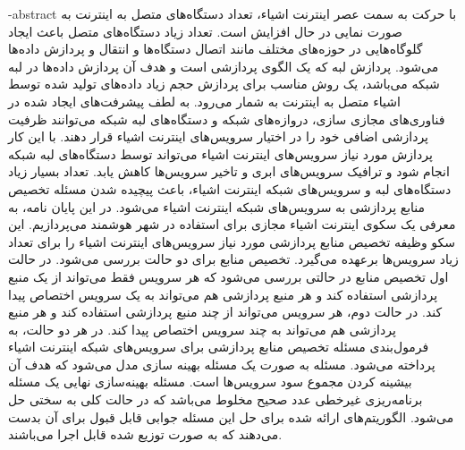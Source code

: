 \cleartorightpage
{}

\fa-abstract{
  با حرکت به سمت عصر اینترنت اشیاء، تعداد دستگاه‌های متصل به اینترنت به صورت نمایی در حال افزایش است.
  تعداد زیاد دستگاه‌های متصل باعث ایجاد گلوگاه‌هایی در حوزه‌های مختلف مانند اتصال دستگاه‌ها و انتقال و پردازش داده‌ها می‌شود.
  پردازش لبه که یک الگوی پردازشی است و هدف آن پردازش داده‌ها در لبه شبکه می‌باشد، یک روش مناسب برای پردازش حجم زیاد داده‌های تولید شده توسط اشیاء متصل به اینترنت به شمار می‌رود.
  به لطف پیشرفت‌های ایجاد شده در فناوری‌های مجازی سازی، دروازه‌های شبکه و دستگاه‌های لبه شبکه می‌توانند ظرفیت پردازشی اضافی خود را در اختیار سرویس‌های اینترنت اشیاء قرار دهند.
  با این کار پردازش‌ مورد نیاز سرویس‌های اینترنت اشیاء می‌تواند توسط دستگاه‌های لبه شبکه انجام شود و ترافیک سرویس‌های ابری و تاخیر سرویس‌ها کاهش یابد.
  تعداد بسیار زیاد دستگاه‌های لبه و سرویس‌های شبکه اینترنت اشیاء، باعث پیچیده شدن مسئله تخصیص منابع پردازشی به سرویس‌های شبکه اینترنت اشیاء می‌شود.
  در این پایان نامه، به معرفی یک سکوی اینترنت اشیاء مجازی برای استفاده در شهر هوشمند می‌پردازیم.
  این سکو وظیفه تخصیص منابع پردازشی مورد نیاز سرویس‌های اینترنت اشیاء را برای تعداد زیاد سرویس‌ها برعهده می‌گیرد.
  تخصیص منابع برای دو حالت بررسی می‌شود.
  در حالت اول تخصیص منابع در حالتی بررسی می‌شود که هر سرویس فقط می‌تواند از یک منبع پردازشی استفاده کند و هر منبع پردازشی هم می‌تواند به یک سرویس اختصاص پیدا کند.
  در حالت دوم، هر سرویس می‌تواند از چند منبع پردازشی استفاده کند و هر منبع پردازشی هم می‌تواند به چند سرویس اختصاص پیدا کند.
  در هر دو حالت، به فرمول‌بندی مسئله تخصیص منابع پردازشی برای سرویس‌های شبکه اینترنت اشیاء پرداخته می‌شود.
  مسئله به صورت یک مسئله بهینه سازی مدل می‌شود که هدف آن بیشینه کردن مجموع سود سرویس‌ها است.
  مسئله بهینه‌سازی نهایی یک مسئله برنامه‌ریزی غیرخطی عدد صحیح مخلوط می‌باشد که در حالت کلی به سختی حل می‌شود.
  الگوریتم‌های ارائه شده برای حل این مسئله جوابی قابل قبول برای آن بدست می‌دهند که به صورت توزیع شده قابل اجرا می‌باشند.
}

\cleartorightpage
\abstractPage

\cleartorightpage
